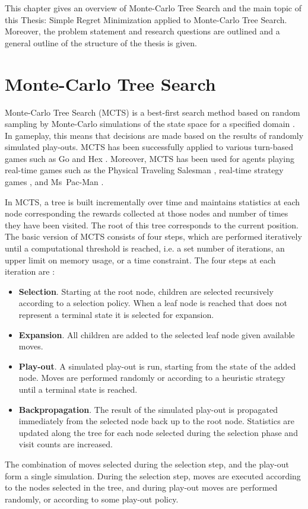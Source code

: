 \documentclass{kecsmstr}
\begin{document}
\begin{chaptercontents}
This chapter gives an overview of Monte-Carlo Tree Search and the main topic of this Thesis: Simple Regret Minimization applied to Monte-Carlo Tree Search. Moreover, the problem statement and research questions are outlined and a general outline of the structure of the thesis is given.

\section{Monte-Carlo Tree Search}
Monte-Carlo Tree Search (MCTS) is a best-first search method based on random sampling by Monte-Carlo simulations of the state space for a specified domain . In gameplay, this means that decisions are made based on the results of randomly simulated play-outs. MCTS has been successfully applied to various turn-based games such as Go  and Hex . Moreover, MCTS has been used for agents playing real-time games such as the Physical Traveling Salesman  , real-time strategy games , and Ms~Pac-Man .

In MCTS, a tree is built incrementally over time and maintains statistics at each node corresponding the rewards collected at those nodes and number of times  they have been visited. The root of this tree corresponds to the current position. The basic version of MCTS consists of four steps, which are performed iteratively until a computational threshold is reached, i.e. a set number of iterations, an upper limit on memory usage, or a time constraint. The four steps at each iteration are :
\begin{itemize}
\item {\bf Selection}. Starting at the root node, children are selected recursively according to a selection policy. When a leaf node is reached that does not represent a terminal state it is selected for expansion.
\item {\bf Expansion}. All children are added to the selected leaf node given available moves.
\item {\bf Play-out}. A simulated play-out is run, starting from the state of the added node. Moves are performed randomly or according to a heuristic strategy until a terminal state is reached.
\item {\bf Backpropagation}. The result of the simulated play-out is propagated immediately from the selected node back up to the root node. Statistics are updated along the tree for each node selected during the selection phase and visit counts are increased.
\end{itemize}
The combination of moves selected during the selection step, and the play-out form a single simulation. During the selection step, moves are executed according to the nodes selected in the tree, and during play-out moves are performed randomly, or according to some play-out policy.


\end{chaptercontents}
\end{document}
